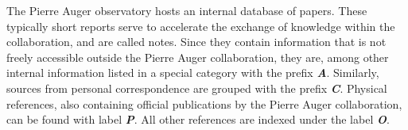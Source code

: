 
\let\chapter=\prepostchapter
\pagestyle{plain}

\printbibheading

The Pierre Auger observatory hosts an internal database of papers. These 
typically short reports serve to accelerate the exchange of knowledge within the
collaboration, and are called \GAP notes. Since they contain information that is
not freely accessible outside the Pierre Auger collaboration, they are, among 
other internal information listed in a special category with the prefix 
\textbf{\textit{A}}. Similarly, sources from personal correspondence are grouped 
with the prefix \textbf{\textit{C}}. Physical references, also containing 
official publications by the Pierre Auger collaboration, can be found with label
\textbf{\textit{P}}. All other references are indexed under the label 
\textbf{\textit{O}}.

\newrefcontext[labelprefix=C]
\printbibliography[keyword={private},title={Personal Correspondence},heading=subbibliography]

\newrefcontext[labelprefix=A]
\printbibliography[keyword={auger},title={GAP Notes},heading=subbibliography]

\newrefcontext[labelprefix=P]
\printbibliography[keyword={phys},notkeyword={GAP-Note},title={Physics References},heading=subbibliography]

\newrefcontext[labelprefix=O]
\printbibliography[notkeyword={private},notkeyword={phys},notkeyword={GAP-Note},title={Other References},heading=subbibliography]

\cleardoublepage
